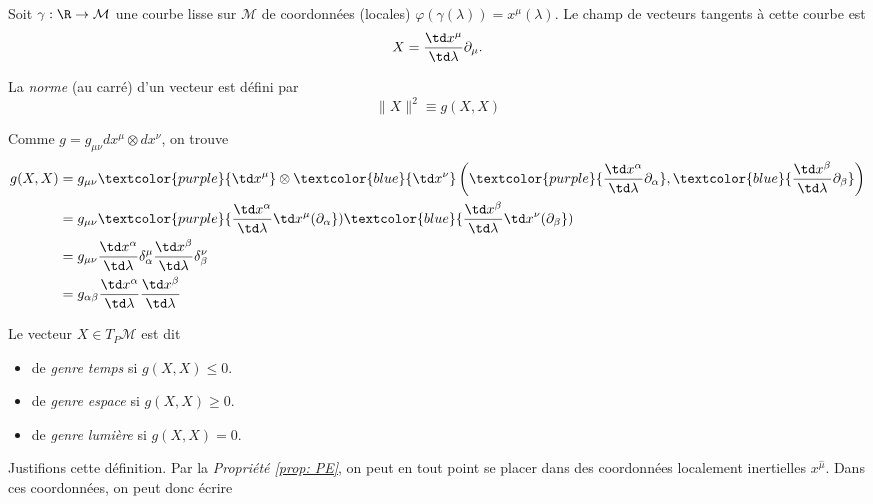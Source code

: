 Soit $\gamma: \R \to \mathcal{M}$ une courbe lisse sur $\mathcal{M}$ de coordonnées (locales) $\varphi(\gamma(\lambda)) = x^{\mu}(\lambda)$. Le champ de vecteurs tangents à cette courbe est
\begin{equation}
X = \frac{\td x^{\mu}}{\td \lambda}\partial_{\mu}.
\end{equation}
\begin{theoremframe}
    \begin{defi}
        La \emph{norme} (au carré) d'un vecteur est défini par
        \begin{equation}
            \lVert X \rVert^2 \equiv g(X,X) 
        \end{equation}
    \end{defi}
\end{theoremframe}
Comme $g = g_{\mu \nu}dx^{\mu}\otimes dx^{\nu}$, on trouve
\begin{align}
    g(X, X) &= g_{\mu \nu}\textcolor{purple}{\td x^{\mu}}\otimes \textcolor{blue}{\td x^{\nu}}\left(\textcolor{purple}{\frac{\td x^{\alpha}}{\td \lambda} \partial_{\alpha}}, \textcolor{blue}{\frac{\td x^{\beta}}{\td \lambda} \partial_{\beta}}\right)\\
    &= g_{\mu \nu}\textcolor{purple}{\frac{\td x^{\alpha}}{\td \lambda} \td x^{\mu}(\partial_{\alpha}})\textcolor{blue}{\frac{\td x^{\beta}}{\td \lambda} \td x^{\nu}(\partial_{\beta}})\\
    &= g_{\mu \nu}\frac{\td x^{\alpha}}{\td \lambda}\delta^{\mu}_{\alpha}\frac{\td x^{\beta}}{\td \lambda}\delta^{\nu}_{\beta}\\
    &= g_{\alpha \beta}\frac{\td x^{\alpha}}{\td \lambda}\frac{\td x^{\beta}}{\td \lambda}
\end{align}
\begin{theoremframe}
    \begin{defi}
        Le vecteur $X \in T_P\mathcal{M}$ est dit
        \begin{itemize}
            \item de \emph{genre temps} si $g(X,X) \leq 0$.
            \item de \emph{genre espace} si $g(X,X) \geq 0$.
            \item de \emph{genre lumière} si $g(X,X) = 0$.
        \end{itemize}
    \end{defi}
\end{theoremframe}
Justifions cette définition. Par la \textit{Propriété \ref{prop: PE}}, on peut en tout point se placer dans des coordonnées localement inertielles $x^{\hat{\mu}}$. Dans ces coordonnées, on peut donc écrire

